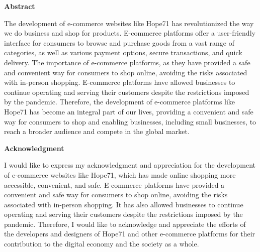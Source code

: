 \documentclass{article}
\begin{document}
\maketitle
\begin{center}

\author{Group D\\
We Works\\ \textbf{Magpie Composite Textile Ltd}\\ Group Members(4)-\\Name: Md Eyamin Molla \\ ID-19202103209(44)\\ Name: Md Rakibur Rahman Zihad\\ ID: 19201103082(43)\\ Name: Md Mohibbullah\\Id:19201103101\\ Name: Nahian Islam\\ID : 19201103028\\
Submitted to\\ Most.Jannatul Ferdoud, Lecturer
}
\end{center}

\newpage
\begin{center}    
\huge \textbf {Abstract}
\end{center}
The development of e-commerce websites like Hope71 has revolutionized the way we do business and shop for products. E-commerce platforms offer a user-friendly interface for consumers to browse and purchase goods from a vast range of categories, as well as various payment options, secure transactions, and quick delivery. The importance of e-commerce platforms, as they have provided a safe and convenient way for consumers to shop online, avoiding the risks associated with in-person shopping. E-commerce platforms have allowed businesses to continue operating and serving their customers despite the restrictions imposed by the pandemic. Therefore, the development of e-commerce platforms like Hope71 has become an integral part of our lives, providing a convenient and safe way for consumers to shop and enabling businesses, including small businesses, to reach a broader audience and compete in the global market.
\begin{center}
    \huge \textbf{Acknowledgment}
\end{center}
I would like to express my acknowledgment and appreciation for the development of e-commerce websites like Hope71, which has made online shopping more accessible, convenient, and safe. E-commerce platforms have provided a convenient and safe way for consumers to shop online, avoiding the risks associated with in-person shopping. It has also allowed businesses to continue operating and serving their customers despite the restrictions imposed by the pandemic. Therefore, I would like to acknowledge and appreciate the efforts of the developers and designers of Hope71 and other e-commerce platforms for their contribution to the digital economy and the society as a whole.
\end{document}
